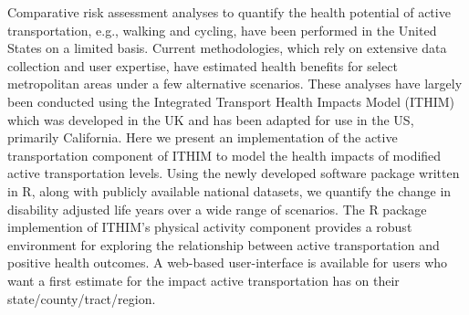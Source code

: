 Comparative risk assessment analyses to quantify the health potential
of active transportation, e.g., walking and cycling, have been
performed in the United States on a limited basis. Current
methodologies, which rely on extensive data collection and user
expertise, have estimated health benefits for select metropolitan
areas under a few alternative scenarios. These analyses have largely
been conducted using the Integrated Transport Health Impacts Model
(ITHIM) which was developed in the UK and has been adapted for use in
the US, primarily California. Here we present an implementation of the
active transportation component of ITHIM to model the health impacts
of modified active transportation levels. Using the newly developed
software package \package{} written in R, along with publicly
available national datasets, we quantify the change in disability
adjusted life years over a wide range of scenarios.  The R package
implemention of ITHIM's physical activity component provides a robust
environment for exploring the relationship between active
transportation and positive health outcomes.  A web-based
user-interface is available for users who want a first estimate for
the impact active transportation has on their
state/county/tract/region.


